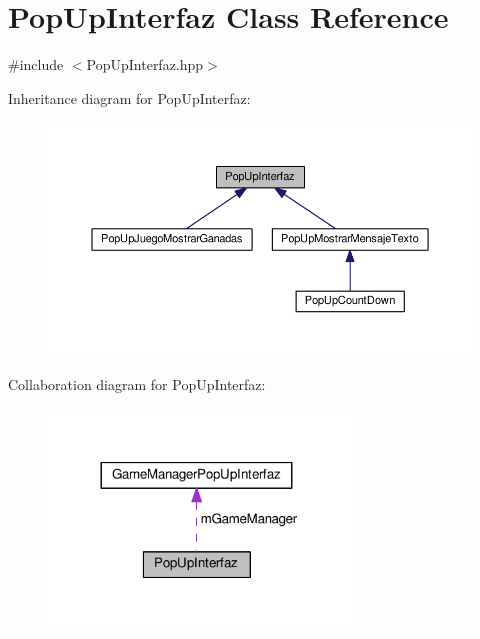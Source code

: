\hypertarget{class_pop_up_interfaz}{}\section{Pop\+Up\+Interfaz Class Reference}
\label{class_pop_up_interfaz}


{\ttfamily \#include $<$Pop\+Up\+Interfaz.\+hpp$>$}



Inheritance diagram for Pop\+Up\+Interfaz\+:
\nopagebreak
\begin{figure}[H]
\begin{center}
\leavevmode
\includegraphics[width=350pt]{class_pop_up_interfaz__inherit__graph}
\end{center}
\end{figure}


Collaboration diagram for Pop\+Up\+Interfaz\+:\nopagebreak
\begin{figure}[H]
\begin{center}
\leavevmode
\includegraphics[width=228pt]{class_pop_up_interfaz__coll__graph}
\end{center}
\end{figure}
